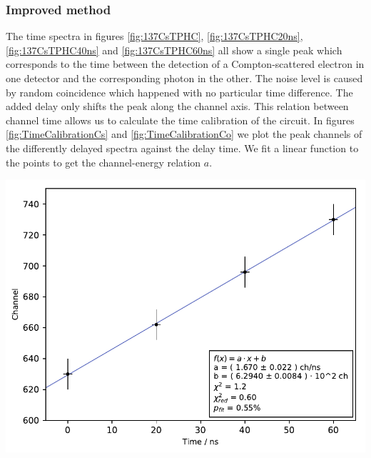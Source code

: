 \subsubsection{Improved method}
%
The time spectra in figures \ref{fig:137CsTPHC}, \ref{fig:137CsTPHC20ns}, \ref{fig:137CsTPHC40ns} and \ref{fig:137CsTPHC60ns} all show a single peak which corresponds to the time between the detection of a Compton-scattered electron in one detector and the corresponding photon in the other.
The noise level is caused by random coincidence which happened with no particular time difference.
The added delay only shifts the peak along the channel axis.
This relation between channel time allows us to calculate the time calibration of the circuit.
In figures \ref{fig:TimeCalibrationCs} and \ref{fig:TimeCalibrationCo} we plot the peak channels of the differently delayed spectra against the delay time.
We fit a linear function to the points to get the channel-energy relation $a$.
%
\par
%
\minipage{\linewidth}
    \begin{center}
        \captionsetup{type=figure}
        \begin{adjustbox}{max width=\linewidth, keepaspectratio}
            \includegraphics[]{pdf/time_calibration-cs}
        \end{adjustbox}
        \label{fig:TimeCalibrationCs}
    \end{center}
\endminipage
%
\par
%
\minipage{\linewidth}
